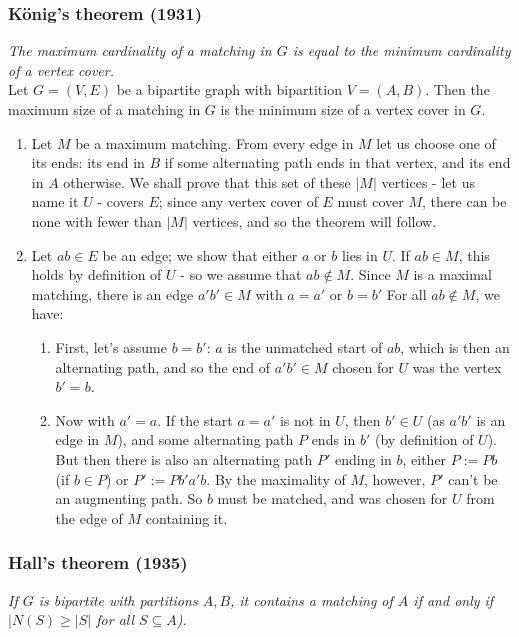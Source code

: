 \subsubsection{König's theorem (1931)} 

\textit{The maximum cardinality of a matching in $G$ is equal to the minimum cardinality of a vertex cover.}\\

Let $G = (V,E)$ be a bipartite graph with bipartition $V = (A, B)$. Then the maximum size of a matching in $G$ is the minimum size of a vertex cover in $G$.
	\begin{enumerate}
		\item Let $M$ be a maximum matching. From every edge in $M$ let us choose one of its ends: its end in $B$ if some alternating path ends in that vertex, and its end in $A$ otherwise. We shall prove that this set of these $|M|$ vertices - let us name it $U$ - covers $E$; since any vertex cover of $E$ must cover $M$, there can be none with fewer than $|M|$ vertices, and so the theorem will follow.
		\item Let $ab \in E$ be an edge; we show that either $a$ or $b$ lies in $U$. If $ab \in M$, this holds by definition of $U$ - so we assume that $ab \notin M$. Since $M$ is a maximal matching, there is an edge $a'b' \in M$ with $a = a'$ or $b = b'$ For all $ab \notin M$, we have:
			\begin{enumerate} 
				\item First, let's assume $b = b'$: $a$ is the unmatched start of $ab$, which is then an alternating path, and so the end of $a'b' \in M$ chosen for $U$ was the vertex $b' = b$.
				\item Now with $a' = a$. If the start $a = a'$  is not in $U$, then $b' \in U$ (as $a'b'$ is an edge in $M$), and some alternating path $P$ ends in $b'$ (by definition of $U$). But then there is also an alternating path $P'$ ending in $b$, either $P := Pb$ (if $b \in P$) or $P' := Pb'a'b$. By the maximality of $M$, however, $P'$ can't be an augmenting path. So $b$ must be matched, and was chosen for $U$ from the edge of $M$ containing it.
			\end{enumerate}
	\end{enumerate}
	
\subsubsection{Hall's theorem (1935)} 

\textit{If $G$ is bipartite with partitions $A,B$, it contains a matching of $A$ if and only if $|N(S) \geq |S|$ for all $S \subseteq A$).}\\

